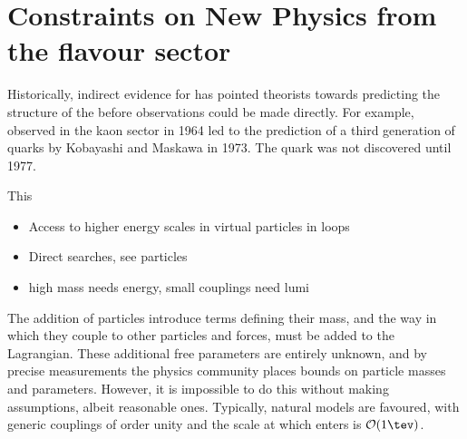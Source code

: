 \section{Constraints on New Physics from the flavour sector}

Historically, indirect evidence for \np has pointed theorists towards predicting the structure of
the \sm before observations could be made directly.
For example, \CPV observed in the kaon sector in 1964 led to the prediction of a third generation of
quarks by Kobayashi and Maskawa in 1973.
The \bquark quark was not discovered until 1977.

This

\begin{itemize}
  \item Access to higher energy scales in virtual particles in loops
  \item Direct searches, see particles
  \item high mass needs energy, small couplings need lumi
\end{itemize}





The addition of \np particles introduce terms defining their mass, and the way in which they couple
to other particles and forces, must be added to the Lagrangian.
These additional free parameters are entirely unknown, and by precise measurements the physics
community places bounds on \np particle masses and parameters.
However, it is impossible to do this without making assumptions, albeit reasonable ones.
Typically, natural models are favoured, with generic couplings of order unity and the
scale at which \np enters is $\mathcal{O}(1\tev)$.

